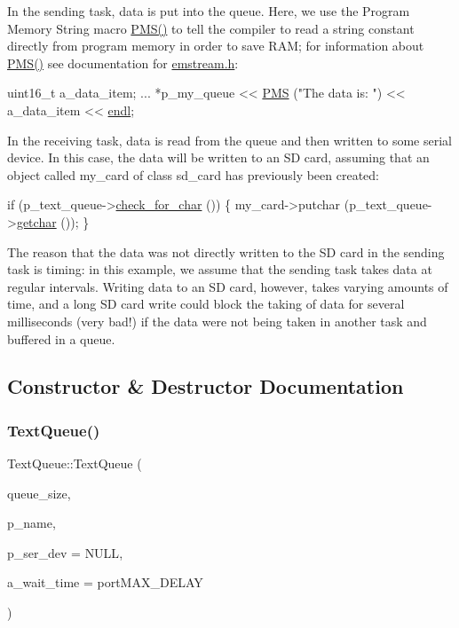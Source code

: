  In the sending task, data is put into the queue. Here, we use the Program Memory String macro {\ttfamily \mbox{\hyperlink{emstream_8h_a076d1892c2e1133e4cc5469015af6423}{P\+M\+S()}}} to tell the compiler to read a string constant directly from program memory in order to save R\+AM; for information about {\ttfamily \mbox{\hyperlink{emstream_8h_a076d1892c2e1133e4cc5469015af6423}{P\+M\+S()}}} see documentation for {\ttfamily \mbox{\hyperlink{emstream_8h}{emstream.\+h}}\+:} 
\begin{DoxyCode}
uint16\_t a\_data\_item;
...
*p\_my\_queue << \mbox{\hyperlink{emstream_8h_a076d1892c2e1133e4cc5469015af6423}{PMS}} (\textcolor{stringliteral}{"The data is: "}) << a\_data\_item << \mbox{\hyperlink{emstream_8h_a5582483c459c0f48e51d96478d5b3407a5cbad4ad24fd9b8c066cdad096cd2f18}{endl}};
\end{DoxyCode}
 In the receiving task, data is read from the queue and then written to some serial device. In this case, the data will be written to an SD card, assuming that an object called {\ttfamily my\+\_\+card} of class {\ttfamily sd\+\_\+card} has previously been created\+: 
\begin{DoxyCode}
\textcolor{keywordflow}{if} (p\_text\_queue->\mbox{\hyperlink{class_text_queue_a4b520515f1110e8d592a3b5a5abc615b}{check\_for\_char}} ())
\{
    my\_card->putchar (p\_text\_queue->\mbox{\hyperlink{class_text_queue_ab682ee4d2cbad87e9496ca424fa03b0a}{getchar}} ());
\}
\end{DoxyCode}
 The reason that the data was not directly written to the SD card in the sending task is timing\+: in this example, we assume that the sending task takes data at regular intervals. Writing data to an SD card, however, takes varying amounts of time, and a long SD card write could block the taking of data for several milliseconds (very bad!) if the data were not being taken in another task and buffered in a queue. 

\subsection{Constructor \& Destructor Documentation}
\mbox{\label{class_text_queue_a2823917efdf4439cc4f70456b8ddf4bd}} 
\subsubsection{\texorpdfstring{Text\+Queue()}{TextQueue()}}
{\footnotesize\ttfamily Text\+Queue\+::\+Text\+Queue (\begin{DoxyParamCaption}\item[{uint16\+\_\+t}]{queue\+\_\+size,  }\item[{const char $\ast$}]{p\+\_\+name,  }\item[{\mbox{\hyperlink{classemstream}{emstream}} $\ast$}]{p\+\_\+ser\+\_\+dev = {\ttfamily NULL},  }\item[{Tick\+Type\+\_\+t}]{a\+\_\+wait\+\_\+time = {\ttfamily portMAX\+\_\+DELAY} }\end{DoxyParamCaption})}



